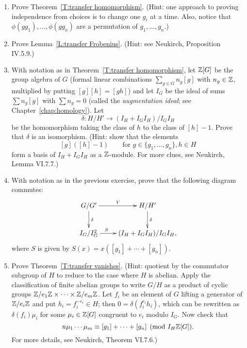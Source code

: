 \begin{enumerate}
\item
Prove Theorem~\ref{T:transfer homomorphism}. (Hint: one approach to proving independence from choices
is to change one $g_i$ at a time. Also, notice that $\phi(gg_1), \dots,
\phi(gg_n)$ are a permutation of $g_1, \dots, g_n$.)
\item
Prove Lemma~\ref{L:transfer Frobenius}.
(Hint: see Neukirch, Proposition IV.5.9.)
\item
With notation as in Theorem~\ref{T:transfer homomorphism},
let $\mathbb{Z}[G]$ be the group algebra of $G$ (formal linear combinations
$\sum_{g \in G} n_g [g]$ with $n_g \in \mathbb{Z}$, multiplied by putting
$[g][h] = [gh]$) and let $I_G$ be the ideal of sums $\sum n_g[g]$ with
$\sum n_g = 0$ (called the \emph{augmentation ideal}; see
Chapter~\ref{chap:homology}). Let 
\[
\delta: H/H' \to (I_{H}+I_GI_{H})/I_GI_{H}
\]
be the homomorphism taking the class of $h$ to the class of $[h]-1$.
Prove that $\delta$ is an isomorphism. (Hint:
show that the elements 
\[
[g]([h]-1) \qquad \mbox{for $g \in \{g_1,\dots,g_n\}, h \in H$}
\]
form a basis of $I_H + I_G I_H$ as a $\mathbb{Z}$-module. For more clues, see Neukirch, Lemma VI.7.7.)
\item
With notation as in the previous exercise, prove that the following diagram commutes:
\[
\xymatrix{
G/G' \ar^{V}[r] \ar^{\delta}[d] & H/H' \ar^{\delta}[d] \\
I_G/I_G^2 \ar^(.3){S}[r] & (I_{H}+I_GI_{H})/I_GI_{H},
}
\]
where $S$
is given by $S(x) = x ([g_1] + \cdots + [g_n])$.
\item
Prove Theorem~\ref{T:transfer vanishes}.
(Hint: quotient by the commutator subgroup of $H$ to reduce
to the case where $H$ is abelian.
Apply the classification of finite abelian groups
to write $G/H$ as a product of cyclic groups $\mathbb{Z}/e_1 \mathbb{Z} \times \cdots \times \mathbb{Z}/e_m \mathbb{Z}$.
Let $f_i$ be an element of $G$ lifting a generator of $\mathbb{Z}/e_i \mathbb{Z}$
and put $h_i = f_i^{-e_i} \in H$; then $0 = \delta(f_i^{e_i} h_i)$,
which can be rewritten as $\delta(f_i) \mu_i$ for some $\mu_i \in \mathbb{Z}[G]$
congruent to $e_i$ modulo $I_G$.
Now check that 
\[n
\mu_1 \cdots \mu_m \equiv [g_1] + \cdots + [g_n] \pmod{I_H \mathbb{Z}[G]}.
\]
For more details, see
Neukirch, Theorem VI.7.6.)
\end{enumerate}

%


